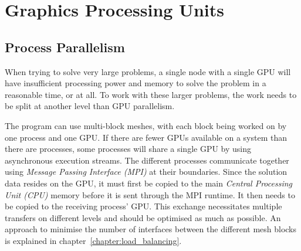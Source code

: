 \chapter{Graphics Processing Units} \label{chapter:graphics_processing_units} 

\section{Process Parallelism} \label{section:process_parallelism}
When trying to solve very large problems, a single node with a single GPU will have insufficient
processing power and memory to solve the problem in a reasonable time, or at all. To work with these
larger problems, the work needs to be split at another level than GPU parallelism.  

The program can use multi-block meshes, with each block being worked on by one process and one GPU.
If there are fewer GPUs available on a system than there are processes, some processes will share a
single GPU by using asynchronous execution streams. The different processes communicate together
using \textit{Message Passing Interface (MPI)} at their boundaries. Since the solution data resides
on the GPU, it must first be copied to the main \textit{Central Processing Unit (CPU)} memory before
it is sent through the MPI runtime. It then needs to be copied to the receiving process' GPU. This
exchange necessitates multiple transfers on different levels and should be optimised as much as
possible. An approach to minimise the number of interfaces between the different mesh blocks is
explained in chapter~\ref{chapter:load_balancing}.